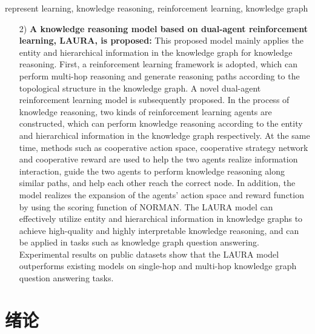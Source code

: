 \documentclass[algorithmlist, AutoFakeBold, AutoFakeSlant, figurelist, tablelist, nomlist, engineering]{seuthesix}
\begin{document}
\begin{englishabstract}{represent learning, knowledge reasoning, reinforcement learning, knowledge graph}
\begin{itemize}
    The NORMAN model can effectively capture the hierarchical and neighborhood information in the knowledge graph, perform high-quality knowledge representation, and can be applied in tasks such as knowledge graph completion.
    Experimental results on public datasets show that the NORMAN model outperforms existing models on knowledge graph completion tasks.
    \item [2)]\textbf{A knowledge reasoning model based on dual-agent reinforcement learning, LAURA, is proposed:}
    This proposed model mainly applies the entity and hierarchical information in the knowledge graph for knowledge reasoning.
    First, a reinforcement learning framework is adopted, which can perform multi-hop reasoning and generate reasoning paths according to the topological structure in the knowledge graph.
    A novel dual-agent reinforcement learning model is subsequently proposed. In the process of knowledge reasoning, two kinds of reinforcement learning agents are constructed, which can perform knowledge reasoning according to the entity and hierarchical information in the knowledge graph respectively. At the same time, methods such as cooperative action space, cooperative strategy network and cooperative reward are used to help the two agents realize information interaction, guide the two agents to perform knowledge reasoning along similar paths, and help each other reach the correct node.
    In addition, the model realizes the expansion of the agents' action space and reward function by using the scoring function of NORMAN.
    The LAURA model can effectively utilize entity and hierarchical information in knowledge graphs to achieve high-quality and highly interpretable knowledge reasoning, and can be applied in tasks such as knowledge graph question answering.
    Experimental results on public datasets show that the LAURA model outperforms existing models on single-hop and multi-hop knowledge graph question answering tasks.
  \end{itemize}
\end{englishabstract} 

\tableofcontents
\mainmatter  %

\chapter{绪论}
\end{document}
